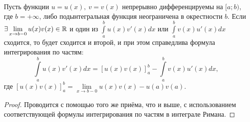 \documentclass[../../main.tex]{subfiles}
\begin{document}
\begin{thm}
	Пусть функции $u = u(x),\ v = v(x)$ непрерывно дифференцируемы на  $[a; b)$,
	где $ b = +\infty $, либо подынтегральная функция неограничена в окрестности 
	$ b $. Если
	$\exists \lim\limits_{x \to b - 0} u(x)v(x) \in \mathbb{R}$ и один из
	$\int\limits_a^bu(x)v'(x)dx$ или $ \int\limits_a^bv(x)u'(x)dx$
	сходится, то будет сходится и второй, и при этом справедлива 
	формула интегрирования по частям:
	\begin{equation}
		\label{lec9:3}
		\int\limits_a^b u(x)v'(x) dx = \left[
		u(x)v(x)\right]_a^b - 
		\int\limits_a^b v(x)u'(x) dx,
	\end{equation}
	где $ \left[u(x)v(x)\right]_a^b =
	\lim\limits_{x \to b - 0} u(x)v(x) -
	u(a)v(a)$.
\end{thm}
\begin{proof}
	Проводится с помощью того же приёма, что и выше, с использованием 
	соответствующей формулы интегрирования по частям в интеграле Римана.
\end{proof}
\end{document}
